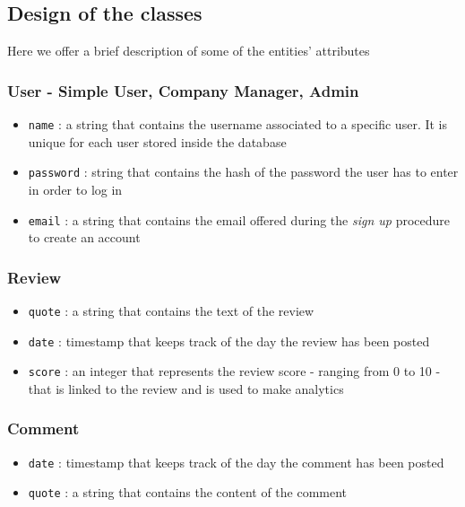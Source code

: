 \subsection{Design of the classes}
Here we offer a brief description of some of the entities' attributes
\subsubsection{User - Simple User, Company Manager, Admin}
\begin{itemize}
    \item \texttt{name} : a string that contains the username associated to a specific user. It is unique for each user stored inside the database
    \item \texttt{password} : string that contains the hash of the password the user has to enter in order to log in 
    \item \texttt{email} : a string that contains the email offered during the \emph{sign up} procedure to create an account 
\end{itemize}
\subsubsection{Review}
\begin{itemize}
    \item \texttt{quote} : a string that contains the text of the review 
    \item \texttt{date} : timestamp that keeps track of the day the review has been posted 
    \item \texttt{score} : an integer that represents the review score - ranging from 0 to 10 - that is linked to the review and is used to make analytics
\end{itemize}
\subsubsection{Comment}
\begin{itemize}
    \item \texttt{date} : timestamp that keeps track of the day the comment has been posted 
    \item \texttt{quote} : a string that contains the content of the comment 
\end{itemize}
